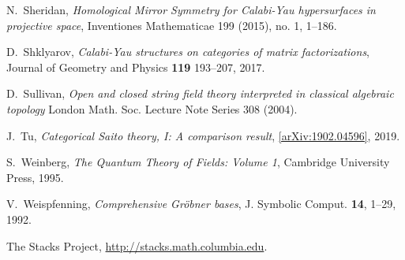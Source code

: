 \documentclass[english,letter paper,12pt,leqno]{article}
\theoremstyle{example}
\numberwithin{equation}{section}
\begin{document}
\begin{thebibliography}{BHLS03}
N.~Sheridan, \textsl{Homological Mirror Symmetry for Calabi-Yau hypersurfaces in projective space}, Inventiones Mathematicae 199 (2015), no. 1, 1--186.

D.~Shklyarov, \textsl{Calabi-Yau structures on categories of matrix factorizations}, Journal of Geometry and Physics \textbf{119} 193--207, 2017.

D.~Sullivan, \textsl{Open and closed string field theory interpreted in classical algebraic topology} London Math. Soc. Lecture Note Series 308 (2004).

J.~Tu, \textsl{Categorical Saito theory, I: A comparison result}, \href{https://arxiv.org/abs/1902.04596}{[arXiv:1902.04596]}, 2019.

S.~Weinberg, \textsl{The Quantum Theory of Fields: Volume 1}, Cambridge University Press, 1995.

V.~Weispfenning, \textsl{Comprehensive Gr\"obner bases}, J. Symbolic Comput. \textbf{14}, 1--29, 1992.

The Stacks Project, \href{http://stacks.math.columbia.edu/}{http://stacks.math.columbia.edu}.

\end{thebibliography}
\end{document}
